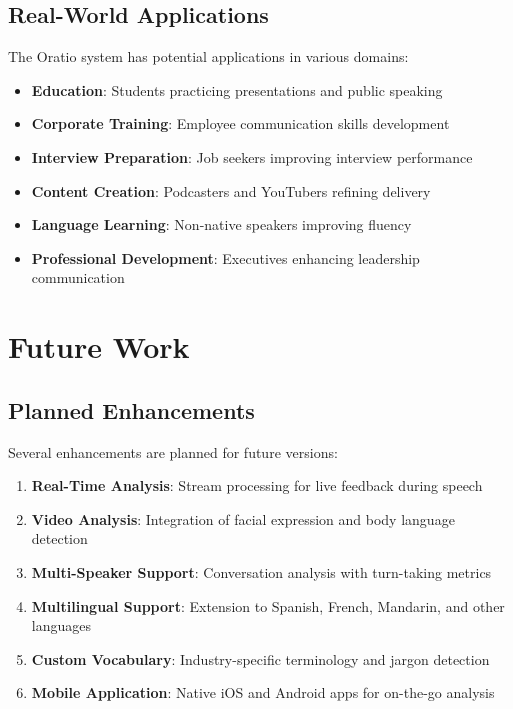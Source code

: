 \documentclass[conference]{IEEEtran}
\begin{document}
\subsection{Real-World Applications}

The Oratio system has potential applications in various domains:

\begin{itemize}
    \item \textbf{Education}: Students practicing presentations and public speaking
    \item \textbf{Corporate Training}: Employee communication skills development
    \item \textbf{Interview Preparation}: Job seekers improving interview performance
    \item \textbf{Content Creation}: Podcasters and YouTubers refining delivery
    \item \textbf{Language Learning}: Non-native speakers improving fluency
    \item \textbf{Professional Development}: Executives enhancing leadership communication
\end{itemize}

\section{Future Work}

\subsection{Planned Enhancements}

Several enhancements are planned for future versions:

\begin{enumerate}
    \item \textbf{Real-Time Analysis}: Stream processing for live feedback during speech
    \item \textbf{Video Analysis}: Integration of facial expression and body language detection
    \item \textbf{Multi-Speaker Support}: Conversation analysis with turn-taking metrics
    \item \textbf{Multilingual Support}: Extension to Spanish, French, Mandarin, and other languages
    \item \textbf{Custom Vocabulary}: Industry-specific terminology and jargon detection
    \item \textbf{Mobile Application}: Native iOS and Android apps for on-the-go analysis
\end{enumerate}
\end{document}
